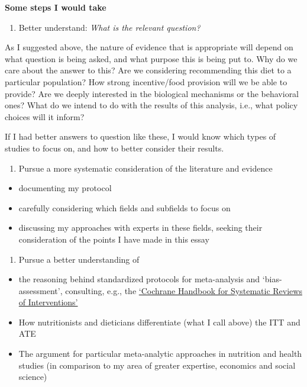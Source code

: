 \documentclass[]{article}
\providecommand{\tightlist}{%
  \setlength{\itemsep}{0pt}\setlength{\parskip}{0pt}}
\begin{document}
\hfill\break

\textbf{Some steps I would take}

\begin{enumerate}
\def\labelenumi{\arabic{enumi}.}
\tightlist
\item
  Better understand: \emph{What is the relevant question?}
\end{enumerate}

As I suggested above, the nature of evidence that is appropriate will
depend on what question is being asked, and what purpose this is being
put to. Why do we care about the answer to this? Are we considering
recommending this diet to a particular population? How strong
incentive/food provision will we be able to provide? Are we deeply
interested in the biological mechanisms or the behavioral ones? What do
we intend to do with the results of this analysis, i.e., what policy
choices will it inform?

If I had better answers to question like these, I would know which types
of studies to focus on, and how to better consider their results.

\begin{enumerate}
\def\labelenumi{\arabic{enumi}.}
\setcounter{enumi}{1}
\tightlist
\item
  Pursue a more systematic consideration of the literature and evidence
\end{enumerate}

\begin{itemize}
\tightlist
\item
  documenting my protocol
\item
  carefully considering which fields and subfields to focus on
\item
  discussing my approaches with experts in these fields, seeking their
  consideration of the points I have made in this essay
\end{itemize}

\begin{enumerate}
\def\labelenumi{\arabic{enumi}.}
\setcounter{enumi}{2}
\tightlist
\item
  Pursue a better understanding of
\end{enumerate}

\begin{itemize}
\item
  the reasoning behind standardized protocols for meta-analysis and
  `bias-assessment', consulting, e.g., the
  \href{https://training.cochrane.org/handbook/current}{`Cochrane
  Handbook for Systematic Reviews of Interventions'}
\item
  How nutritionists and dieticians differentiate (what I call above) the
  ITT and ATE
\item
  The argument for particular meta-analytic approaches in nutrition and
  health studies (in comparison to my area of greater expertise,
  economics and social science)
\end{itemize}
\end{document}
